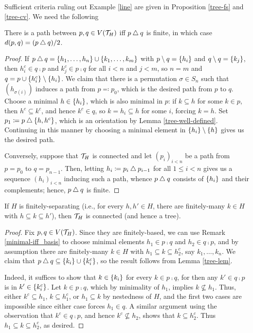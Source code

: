 \documentclass{amsart}
\begin{document}
    Sufficient criteria ruling out Example \ref{line} are given in Proposition \ref{tree-fs} and \ref{tree-cv}. We need the following

    \begin{lemma}\label{tree-lem}
        There is a path between $p,q\in V(\mathcal{T}_H)$ iff $p\bigtriangleup q$ is finite, in which case $d(p,q)=(p\bigtriangleup q)/2$.
    \end{lemma}
    \begin{proof}
        If $p\bigtriangleup q=\left\{h_1,\dots,h_n\right\}\cup\left\{k_1,\dots,k_m\right\}$ with $p\setminus q=\left\{h_i\right\}$ and $q\setminus q=\left\{k_j\right\}$, then $h_i^c\in q\comp p$ and $k_j^c\in p\comp q$ for all $i<n$ and $j<m$, so $n=m$ and $q=p\cup\left\{h_i^c\right\}\setminus\left\{h_i\right\}$. We claim that there is a permutation $\sigma\in S_n$ such that $(h_{\sigma(i)})$ induces a path from $p\eqqcolon p_0$, which is the desired path from $p$ to $q$. Choose a minimal $h\in\left\{h_i\right\}$, which is also minimal in $p$: if $k\subseteq h$ for some $k\in p$, then $h^c\subseteq k^c$, and hence $k^c\in q$, so $k=h_i\subseteq h$ for some $i$, forcing $k=h$. Set $p_1\coloneqq p\bigtriangleup\left\{h,h^c\right\}$, which is an orientation by Lemma \ref{tree-well-defined}. Continuing in this manner by choosing a minimal element in $\left\{h_i\right\}\setminus\left\{h\right\}$ gives us the desired path.

        Conversely, suppose that $\mathcal{T}_H$ is connected and let $(p_i)_{i<n}$ be a path from $p=p_0$ to $q=p_{n-1}$. Then, letting $h_i\coloneqq p_i\bigtriangleup p_{i-1}$ for all $1\leq i<n$ gives us a sequence $(h_i)_{i<n}$ inducing such a path, whence $p\bigtriangleup q$ consists of $\left\{h_i\right\}$ and their complements; hence, $p\bigtriangleup q$ is finite.
    \end{proof}

    \begin{proposition}\label{tree-fs}
        If $H$ is finitely-separating (i.e., for every $h,h'\in H$, there are finitely-many $k\in H$ with $h\subseteq k\subseteq h'$), then $\mathcal{T}_H$ is connected (and hence a tree).
    \end{proposition}
    \begin{proof}
        Fix $p,q\in V(\mathcal{T}_H)$. Since they are finitely-based, we can use Remark \ref{minimal-iff_basis} to choose minimal elements $h_1\in p\comp q$ and $h_2\in q\comp p$, and by assumption there are finitely-many $k\in H$ with $h_1\subseteq k\subseteq h_2^c$, say $k_1,\dots,k_n$. We claim that $p\bigtriangleup q\subseteq\left\{k_i\right\}\cup\left\{k_i^c\right\}$, so the result follows from Lemma \ref{tree-lem}.

        Indeed, it suffices to show that $k\in\left\{k_i\right\}$ for every $k\in p\comp q$, for then any $k'\in q\comp p$ is in $k'\in\left\{k_i^c\right\}$. Let $k\in p\comp q$, which by minimality of $h_1$, implies $k\not\subseteq h_1$. Thus, either $k^c\subseteq h_1$, $k\subseteq h_1^c$, or $h_1\subseteq k$ by nestedness of $H$, and the first two cases are impossible since either case forces $h_1\in q$. A similar argument using the observation that $k^c\in q\comp p$, and hence $k^c\not\subseteq h_2$, shows that $k\subseteq h_2^c$. Thus $h_1\subseteq k\subseteq h_2^c$, as desired.
    \end{proof}

    \begin{proposition}\label{tree-cv}
        
    \end{proposition}
\end{document}
